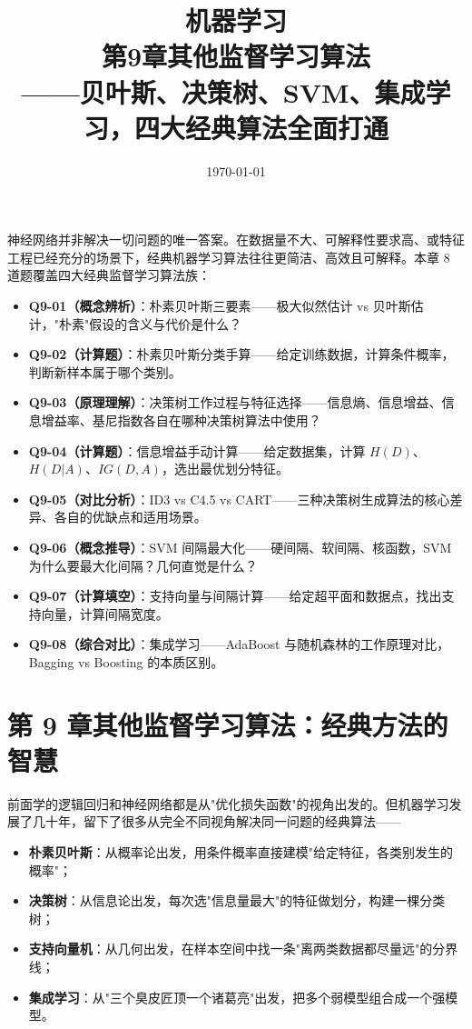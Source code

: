 \documentclass[a4paper,11pt]{ctexart}
\title{\textbf{机器学习\\第9章\quad 其他监督学习算法}\\[0.5em]
{\large\color{gray}——贝叶斯、决策树、SVM、集成学习，四大经典算法全面打通}}
\date{\today}
\begin{document}
\maketitle

\begin{beginnerbox}
    神经网络并非解决一切问题的唯一答案。在数据量不大、可解释性要求高、或特征工程已经充分的场景下，经典机器学习算法往往更简洁、高效且可解释。本章 8 道题覆盖四大经典监督学习算法族：

    \begin{itemize}
        \item \textbf{Q9-01（概念辨析）}：朴素贝叶斯三要素——极大似然估计 vs 贝叶斯估计，"朴素"假设的含义与代价是什么？
        \item \textbf{Q9-02（计算题）}：朴素贝叶斯分类手算——给定训练数据，计算条件概率，判断新样本属于哪个类别。
        \item \textbf{Q9-03（原理理解）}：决策树工作过程与特征选择——信息熵、信息增益、信息增益率、基尼指数各自在哪种决策树算法中使用？
        \item \textbf{Q9-04（计算题）}：信息增益手动计算——给定数据集，计算 $H(D)$、$H(D|A)$、$IG(D,A)$，选出最优划分特征。
        \item \textbf{Q9-05（对比分析）}：ID3 vs C4.5 vs CART——三种决策树生成算法的核心差异、各自的优缺点和适用场景。
        \item \textbf{Q9-06（概念推导）}：SVM 间隔最大化——硬间隔、软间隔、核函数，SVM 为什么要最大化间隔？几何直觉是什么？
        \item \textbf{Q9-07（计算填空）}：支持向量与间隔计算——给定超平面和数据点，找出支持向量，计算间隔宽度。
        \item \textbf{Q9-08（综合对比）}：集成学习——AdaBoost 与随机森林的工作原理对比，Bagging vs Boosting 的本质区别。
    \end{itemize}
\end{beginnerbox}

\section{第 9 章\quad 其他监督学习算法：经典方法的智慧}

前面学的逻辑回归和神经网络都是从"优化损失函数"的视角出发的。但机器学习发展了几十年，留下了很多从完全不同视角解决同一问题的经典算法——

\begin{itemize}
    \item \textbf{朴素贝叶斯}：从概率论出发，用条件概率直接建模"给定特征，各类别发生的概率"；
    \item \textbf{决策树}：从信息论出发，每次选"信息量最大"的特征做划分，构建一棵分类树；
    \item \textbf{支持向量机}：从几何出发，在样本空间中找一条"离两类数据都尽量远"的分界线；
    \item \textbf{集成学习}：从"三个臭皮匠顶一个诸葛亮"出发，把多个弱模型组合成一个强模型。
\end{itemize}
\end{document}
